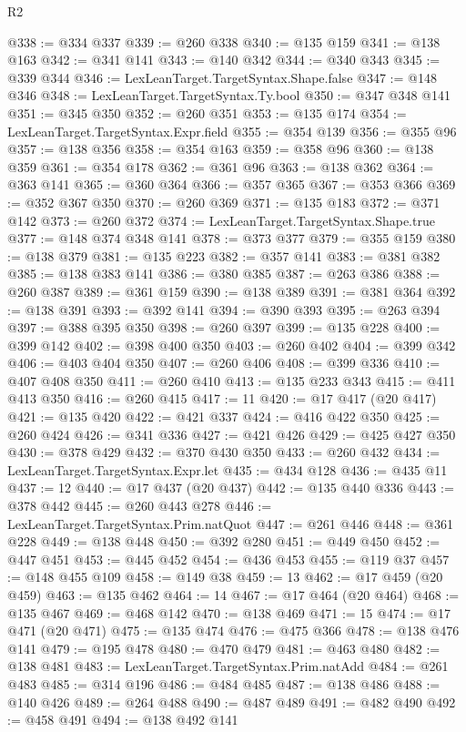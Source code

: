 \begin{lexlean}{R2}
\begin{coremodule}
@338 := @334 @337
@339 := @260 @338
@340 := @135 @159
@341 := @138 @163
@342 := @341 @141
@343 := @140 @342
@344 := @340 @343
@345 := @339 @344
@346 := LexLeanTarget.TargetSyntax.Shape.false
@347 := @148 @346
@348 := LexLeanTarget.TargetSyntax.Ty.bool
@350 := @347 @348 @141
@351 := @345 @350
@352 := @260 @351
@353 := @135 @174
@354 := LexLeanTarget.TargetSyntax.Expr.field
@355 := @354 @139
@356 := @355 @96
@357 := @138 @356
@358 := @354 @163
@359 := @358 @96
@360 := @138 @359
@361 := @354 @178
@362 := @361 @96
@363 := @138 @362
@364 := @363 @141
@365 := @360 @364
@366 := @357 @365
@367 := @353 @366
@369 := @352 @367 @350
@370 := @260 @369
@371 := @135 @183
@372 := @371 @142
@373 := @260 @372
@374 := LexLeanTarget.TargetSyntax.Shape.true
@377 := @148 @374 @348 @141
@378 := @373 @377
@379 := @355 @159
@380 := @138 @379
@381 := @135 @223
@382 := @357 @141
@383 := @381 @382
@385 := @138 @383 @141
@386 := @380 @385
@387 := @263 @386
@388 := @260 @387
@389 := @361 @159
@390 := @138 @389
@391 := @381 @364
@392 := @138 @391
@393 := @392 @141
@394 := @390 @393
@395 := @263 @394
@397 := @388 @395 @350
@398 := @260 @397
@399 := @135 @228
@400 := @399 @142
@402 := @398 @400 @350
@403 := @260 @402
@404 := @399 @342
@406 := @403 @404 @350
@407 := @260 @406
@408 := @399 @336
@410 := @407 @408 @350
@411 := @260 @410
@413 := @135 @233 @343
@415 := @411 @413 @350
@416 := @260 @415
@417 := 11
@420 := @17 @417 (@20 @417)
@421 := @135 @420
@422 := @421 @337
@424 := @416 @422 @350
@425 := @260 @424
@426 := @341 @336
@427 := @421 @426
@429 := @425 @427 @350
@430 := @378 @429
@432 := @370 @430 @350
@433 := @260 @432
@434 := LexLeanTarget.TargetSyntax.Expr.let
@435 := @434 @128
@436 := @435 @11
@437 := 12
@440 := @17 @437 (@20 @437)
@442 := @135 @440 @336
@443 := @378 @442
@445 := @260 @443 @278
@446 := LexLeanTarget.TargetSyntax.Prim.natQuot
@447 := @261 @446
@448 := @361 @228
@449 := @138 @448
@450 := @392 @280
@451 := @449 @450
@452 := @447 @451
@453 := @445 @452
@454 := @436 @453
@455 := @119 @37
@457 := @148 @455 @109
@458 := @149 @38
@459 := 13
@462 := @17 @459 (@20 @459)
@463 := @135 @462
@464 := 14
@467 := @17 @464 (@20 @464)
@468 := @135 @467
@469 := @468 @142
@470 := @138 @469
@471 := 15
@474 := @17 @471 (@20 @471)
@475 := @135 @474
@476 := @475 @366
@478 := @138 @476 @141
@479 := @195 @478
@480 := @470 @479
@481 := @463 @480
@482 := @138 @481
@483 := LexLeanTarget.TargetSyntax.Prim.natAdd
@484 := @261 @483
@485 := @314 @196
@486 := @484 @485
@487 := @138 @486
@488 := @140 @426
@489 := @264 @488
@490 := @487 @489
@491 := @482 @490
@492 := @458 @491
@494 := @138 @492 @141

\end{coremodule}
\end{lexlean}
